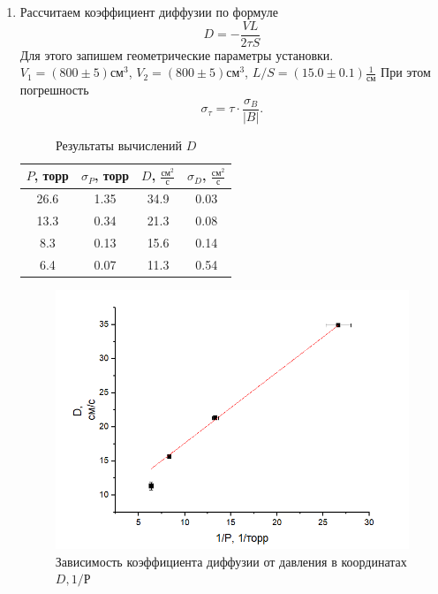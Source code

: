 \documentclass[12pt]{article}
\begin{document}
\begin{enumerate}
\begin{table}[H]
            \label{tab:approx}
        \end{table}
        \item Рассчитаем коэффициент диффузии по формуле \[D = -\frac{VL}{2\tau S}\]
        Для этого запишем геометрические параметры установки. $V_1 = (800 \pm 5) \text{см}^3$,
        $V_2 = (800 \pm 5) \text{см}^3$, $L/S = (15.0 \pm 0.1) \frac{1}{\text{см}}$
        При этом погрешность
        \[ \sigma_\tau = \tau \cdot \frac{\sigma_{B}}{|B|}. \]
        \begin{table}[H]
            \centering
            \begin{tabular}{|c|c|c|c|}
                \hline
                $ P $, торр &$ \sigma_P $, торр & $ D $, $ \frac{\text{см}^2}{\text{с}} $ & $ \sigma_D $, $ \frac{\text{см}^2}{\text{с}} $ \\ \hline
                26.6 & 1.35 & 34.9 & 0.03 \\ \hline
                13.3 & 0.34 & 21.3 & 0.08 \\ \hline
                8.3 & 0.13 & 15.6 & 0.14 \\ \hline
                6.4 & 0.07 & 11.3 & 0.54 \\ \hline
            \end{tabular}
            \caption{Результаты вычислений $D$}
            \label{tab:Dres}
        \end{table}
        \begin{figure} [H]
            \caption{Зависимость коэффициента диффузии от 
            давления в координатах $D, 1/Р$}
            \centering 
            \includegraphics[scale=0.8]{p).png} 
        \end{figure}


\end{enumerate}
\end{document}
